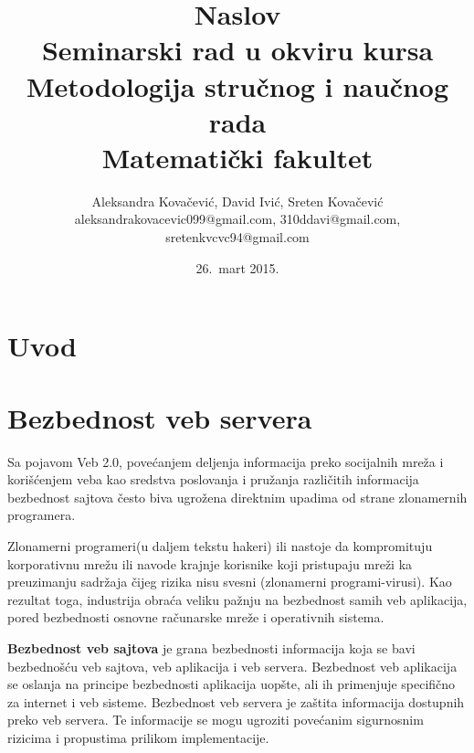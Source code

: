 \documentclass[a4paper]{article}
\begin{document}
\title{Naslov\\ \small{Seminarski rad u okviru kursa\\Metodologija stručnog i naučnog rada\\ Matematički fakultet}}

\author{Aleksandra Kovačević, David Ivić, Sreten Kovačević\\ aleksandrakovacevic099@gmail.com, 310ddavi@gmail.com,\\ sretenkvcvc94@gmail.com}
\date{26.~mart 2015.}
\maketitle

\abstract{
}

\tableofcontents

\newpage

\section{Uvod}
\section{Bezbednost veb servera}


Sa pojavom Veb 2.0, pove\'{c}anjem deljenja informacija preko socijalnih mre\v{z}a i kori\v{s}\'{c}enjem veba kao sredstva poslovanja i pru\v{z}anja razli\v{c}itih informacija bezbednost sajtova \v{c}esto biva ugro\v{z}ena direktnim upadima od strane zlonamernih programera.

Zlonamerni programeri(u daljem tekstu hakeri) ili nastoje da kompromituju korporativnu mre\v{z}u ili navode krajnje korisnike koji pristupaju mre\v{z}i ka preuzimanju sadr\v{z}aja \v{c}ijeg rizika nisu svesni (zlonamerni programi-virusi). Kao rezultat toga, industrija obra\'{c}a veliku pa\v{z}nju na bezbednost samih veb aplikacija, pored bezbednosti osnovne ra\v{c}unarske mre\v{z}e i operativnih sistema.

\textbf{Bezbednost veb sajtova} je grana bezbednosti informacija koja se bavi bezbedno\v{s}\'{c}u veb sajtova, veb aplikacija i veb servera. Bezbednost veb aplikacija se oslanja na principe bezbednosti aplikacija uop\v{s}te, ali ih primenjuje specifi\v{c}no za internet i veb sisteme.
Bezbednost veb servera je za\v{s}tita informacija dostupnih preko veb servera. Te informacije se mogu ugroziti pove\'{c}anim sigurnosnim rizicima i propustima prilikom implementacije.
\end{document}
